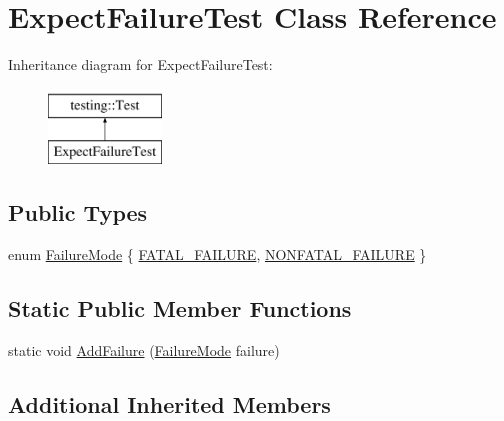 \hypertarget{class_expect_failure_test}{\section{Expect\-Failure\-Test Class Reference}
\label{class_expect_failure_test}
}
Inheritance diagram for Expect\-Failure\-Test\-:\begin{figure}[H]
\begin{center}
\leavevmode
\includegraphics[height=2.000000cm]{class_expect_failure_test}
\end{center}
\end{figure}
\subsection*{Public Types}
\begin{DoxyCompactItemize}
\item 
enum \hyperlink{class_expect_failure_test_aad05da10bb15d21a434eba3b37011406}{Failure\-Mode} \{ \hyperlink{class_expect_failure_test_aad05da10bb15d21a434eba3b37011406a3d618496b7e2a2c256e02186bddee4ec}{F\-A\-T\-A\-L\-\_\-\-F\-A\-I\-L\-U\-R\-E}, 
\hyperlink{class_expect_failure_test_aad05da10bb15d21a434eba3b37011406aeabdbecc0c4550d4f46cd44ac62fb92b}{N\-O\-N\-F\-A\-T\-A\-L\-\_\-\-F\-A\-I\-L\-U\-R\-E}
 \}
\end{DoxyCompactItemize}
\subsection*{Static Public Member Functions}
\begin{DoxyCompactItemize}
\item 
static void \hyperlink{class_expect_failure_test_ab9aeb7820ff7953fc2975ecc5abd046b}{Add\-Failure} (\hyperlink{class_expect_failure_test_aad05da10bb15d21a434eba3b37011406}{Failure\-Mode} failure)
\end{DoxyCompactItemize}
\subsection*{Additional Inherited Members}


